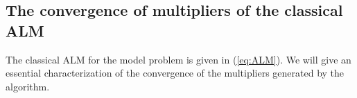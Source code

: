 \documentclass[leqno]{amsart}
\newtheorem{Example}[Theorem]{Example}
\theoremstyle{definition}
\begin{document}
%
%

\subsection{The convergence of multipliers of the classical ALM} The classical ALM for the model problem is given in (\ref{eq:ALM}). We will give an essential characterization of the convergence of the multipliers generated by the algorithm.
\end{document}
